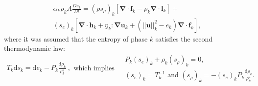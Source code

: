\documentclass[preprint,10pt]{elsarticle}
\renewcommand{\div}{\mbold{\nabla}\! \cdot \!}
\newcommand{\grad}{\mbold{\nabla}}
\newcommand{\mbold}[1]{\boldsymbol#1}
\newcommand{\eqt}[1]{Eq.~(\ref{#1})}                     %
\begin{document}
%
\begin{multline}\label{eq:ent-res-7-eqn-diss-terms}
\alpha_k \rho_k A \frac{Ds_k}{Dt} =  (\rho s_\rho)_k \left[ \div \mbold f_k - \rho_k \div \mbold l_k \right] + \\
\left(s_e\right)_k \left[ \div \mbold h_k + \mathbb{g}_k : \grad \mbold u_k +  \left( || \mbold u ||^2_k - e_k\right) \div \mbold f_k  \right],
\end{multline}
%
where it was assumed that the entropy of phase $k$ satisfies the second thermodynamic law: 
%
\begin{subequations}
\begin{align}\label{eq:2nd-therm-laws-sect4}
T_k \text{d} s_k = \text{d}e_k - P_k\frac{\text{d}\rho_k}{\rho_k^2} \ ,
\end{align}
\text{which implies } 
\begin{align}
&P_k (s_e)_k + \rho_k (s_\rho)_k = 0, \\
&(s_e)_k = T_k^{-1} \text{ and } (s_\rho)_k = - (s_e)_k P_k \frac{\text{d}\rho_k}{\rho_k^2}. \nonumber
\end{align}
\end{subequations}
% 
\end{document}
